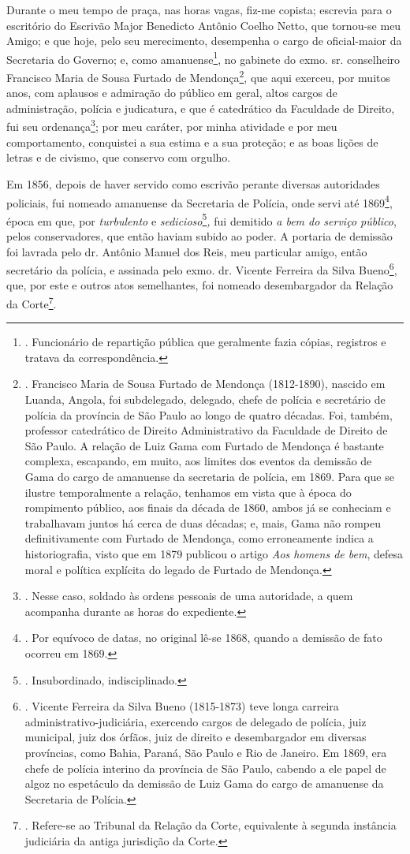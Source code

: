 Durante o meu tempo de praça, nas horas vagas, fiz-me copista; escrevia
para o escritório do Escrivão Major Benedicto Antônio Coelho Netto, que
tornou-se meu Amigo; e que hoje, pelo seu merecimento, desempenha o
cargo de oficial-maior da Secretaria do Governo; e, como
amanuense\footnote{. Funcionário de repartição pública que geralmente
  fazia cópias, registros e tratava da correspondência.}, no gabinete do
exmo. sr. conselheiro Francisco Maria de Sousa Furtado de
Mendonça\footnote{. Francisco Maria de Sousa Furtado de Mendonça
  (1812-1890), nascido em Luanda, Angola, foi subdelegado, delegado,
  chefe de polícia e secretário de polícia da província de São Paulo ao
  longo de quatro décadas. Foi, também, professor catedrático de Direito
  Administrativo da Faculdade de Direito de São Paulo. A relação de Luiz
  Gama com Furtado de Mendonça é bastante complexa, escapando, em muito,
  aos limites dos eventos da demissão de Gama do cargo de amanuense da
  secretaria de polícia, em 1869. Para que se ilustre temporalmente a
  relação, tenhamos em vista que à época do rompimento público, aos
  finais da década de 1860, ambos já se conheciam e trabalhavam juntos
  há cerca de duas décadas; e, mais, Gama não rompeu definitivamente com
  Furtado de Mendonça, como erroneamente indica a historiografia, visto
  que em 1879 publicou o artigo \emph{Aos homens de bem}, defesa moral e
  política explícita do legado de Furtado de Mendonça.}, que aqui
exerceu, por muitos anos, com aplausos e admiração do público em geral,
altos cargos de administração, polícia e judicatura, e que é catedrático
da Faculdade de Direito, fui seu ordenança\footnote{. Nesse caso,
  soldado às ordens pessoais de uma autoridade, a quem acompanha durante
  as horas do expediente.}; por meu caráter, por minha atividade e por
meu comportamento, conquistei a sua estima e a sua proteção; e as boas
lições de letras e de civismo, que conservo com orgulho.

Em 1856, depois de haver servido como escrivão perante diversas
autoridades policiais, fui nomeado amanuense da Secretaria de Polícia,
onde servi até 1869\footnote{. Por equívoco de datas, no original lê-se
  1868, quando a demissão de fato ocorreu em 1869.}, época em que, por
\emph{turbulento} e \emph{sedicioso}\footnote{. Insubordinado,
  indisciplinado.}\emph{,} fui demitido \emph{a bem do serviço público},
pelos conservadores, que então haviam subido ao poder. A portaria de
demissão foi lavrada pelo dr. Antônio Manuel dos Reis, meu particular
amigo, então secretário da polícia, e assinada pelo exmo. dr. Vicente
Ferreira da Silva Bueno\footnote{. Vicente Ferreira da Silva Bueno
  (1815-1873) teve longa carreira administrativo-judiciária, exercendo
  cargos de delegado de polícia, juiz municipal, juiz dos órfãos, juiz
  de direito e desembargador em diversas províncias, como Bahia, Paraná,
  São Paulo e Rio de Janeiro. Em 1869, era chefe de polícia interino da
  província de São Paulo, cabendo a ele papel de algoz no espetáculo da
  demissão de Luiz Gama do cargo de amanuense da Secretaria de Polícia.},
que, por este e outros atos semelhantes, foi nomeado desembargador da
Relação da Corte\footnote{. Refere-se ao Tribunal da Relação da Corte,
  equivalente à segunda instância judiciária da antiga jurisdição da
  Corte.}.

